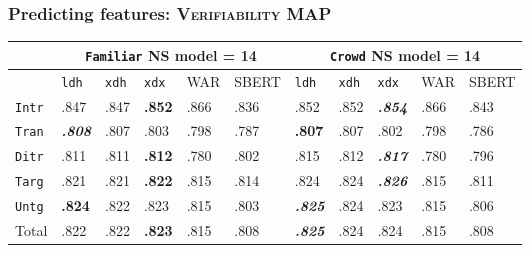 \documentclass[xcolor={dvipsnames}]{beamer}
\newcommand{\feat}[1]{\textsc{#1}}
\newcommand{\param}[1]{\texttt{#1}}
\begin{document}
\begin{frame}
\frametitle{Predicting features: \feat{Verifiability} MAP}

\small

\begin{table}[htb!]
\begin{center}
\setlength{\tabcolsep}{.35em}
\begin{tabular}{|l||l|l|l||l|l||l|l|l||l|l|}
\hline
 & \multicolumn{5}{c||}{\param{Fam\-il\-iar} NS model = 14} & \multicolumn{5}{c|}{\param{Crowd} NS model = 14} \\
\hline
    		& \param{ldh}	& \param{xdh} &	\param{xdx} & WAR	& {\scriptsize SBERT} & \param{ldh}	& \param{xdh} &	\param{xdx} & WAR	& {\scriptsize SBERT} \\ \hline
\hline
\param{Intr}  & .847                   & .847 & \textbf{.852} & .866 & .836 & .852                   & .852 & \textit{\textbf{.854}} & .866 & .843 \\ \hline
\param{Tran}  & \textit{\textbf{.808}} & .807 & .803          & .798 & .787 & \textbf{.807}          & .807 & .802                   & .798 & .786 \\ \hline
\param{Ditr}  & .811                   & .811 & \textbf{.812} & .780 & .802 & .815                   & .812 & \textit{\textbf{.817}} & .780 & .796 \\ \hline
\hline
\param{Targ}  & .821                   & .821 & \textbf{.822} & .815 & .814 & .824                   & .824 & \textit{\textbf{.826}} & .815 & .811 \\ \hline
\param{Untg}  & \textbf{.824}          & .822 & .823          & .815 & .803 & \textit{\textbf{.825}} & .824 & .823                   & .815 & .806 \\ \hline
\hline
Total & .822                   & .822 & \textbf{.823} & .815 & .808 & \textit{\textbf{.825}} & .824 & .824                   & .815 & .808 \\ \hline
\end{tabular}
\end{center}
\end{table}


\end{frame}
\end{document}
